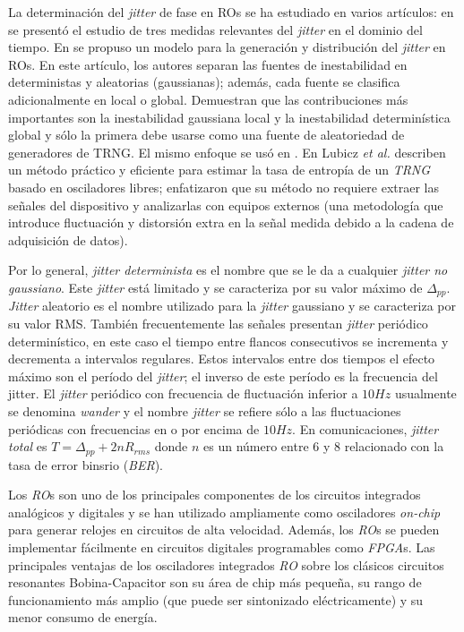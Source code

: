 La determinación del \textit{jitter} de fase en ROs se ha estudiado en varios artículos: en \cite{McNeill1997} se presentó el estudio de tres medidas relevantes del \textit{jitter} en el dominio del tiempo.
En \cite{Valtchanov2008} se propuso un modelo para la generación y distribución del \textit{jitter} en ROs.
En este artículo, los autores separan las fuentes de inestabilidad en deterministas y aleatorias (gaussianas); además, cada fuente se clasifica adicionalmente en local o global.
Demuestran que las contribuciones más importantes son la inestabilidad gaussiana local y la inestabilidad determinística global y sólo la primera debe usarse como una fuente de aleatoriedad de generadores de TRNG.
El mismo enfoque se usó en \cite{Fischer2008, Valtchanov2010, Baudet2011, Jessa2011}.
En \cite{Lubicz2014} Lubicz \textit{et al.} describen un método práctico y eficiente para estimar la tasa de entropía de un \emph{TRNG} basado en osciladores libres; enfatizaron que su método no requiere extraer las señales del dispositivo y analizarlas con equipos externos (una metodología que introduce fluctuación y distorsión extra en la señal medida debido a la cadena de adquisición de datos).

Por lo general, \emph{jitter determinista} es el nombre que se le da a cualquier \emph{jitter no gaussiano}.
Este \emph{jitter} está limitado y se caracteriza por su valor máximo de $\Delta_{pp}$.
\textit{Jitter} aleatorio es el nombre utilizado para la \textit{jitter} gaussiano y se caracteriza por su valor RMS.
También frecuentemente las señales presentan \textit{jitter} periódico determinístico, en este caso el tiempo entre flancos consecutivos se incrementa y decrementa a intervalos regulares.
Estos intervalos entre dos tiempos el efecto máximo son el período del \textit{jitter}; el inverso de este período  es la frecuencia del jitter.
El \textit{jitter} periódico con frecuencia de fluctuación inferior a $10 Hz$ usualmente se denomina \emph{wander} y el nombre \emph{jitter} se refiere sólo a las fluctuaciones periódicas con frecuencias en o por encima de $10 Hz$.
En comunicaciones, \emph{jitter total} es $T = \Delta_{pp} + 2nR_{rms}$ donde $n$ es un número entre $6$ y $8$ relacionado con la tasa de error binsrio (\emph{BER}).

Los \emph{RO}s son uno de los principales componentes de los circuitos integrados analógicos y digitales y se han utilizado ampliamente como osciladores \emph{on-chip} para generar relojes en circuitos de alta velocidad.
Además, los \emph{RO}s se pueden implementar fácilmente en circuitos digitales programables como \emph{FPGA}s.
Las principales ventajas de los osciladores integrados \emph{RO} sobre los clásicos circuitos resonantes Bobina-Capacitor son su área de chip más pequeña, su rango de funcionamiento más amplio (que puede ser sintonizado eléctricamente) y su menor consumo de energía.

